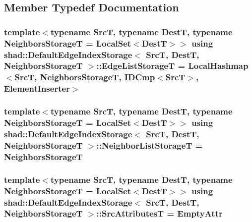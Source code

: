 \subsection{Member Typedef Documentation}
\hypertarget{classshad_1_1DefaultEdgeIndexStorage_af083de6d56b46413f55dc5fea0384afa}{
\subsubsection[{Edge\-List\-Storage\-T}]{\setlength{\rightskip}{0pt plus 5cm}template$<$typename Src\-T, typename Dest\-T, typename Neighbors\-Storage\-T = Local\-Set$<$\-Dest\-T$>$$>$ using {\bf shad\-::\-Default\-Edge\-Index\-Storage}$<$ Src\-T, Dest\-T, Neighbors\-Storage\-T $>$\-::{\bf Edge\-List\-Storage\-T} =  {\bf Local\-Hashmap}$<$Src\-T, Neighbors\-Storage\-T, {\bf I\-D\-Cmp}$<$Src\-T$>$, {\bf Element\-Inserter}$>$}}\label{classshad_1_1DefaultEdgeIndexStorage_af083de6d56b46413f55dc5fea0384afa}
\hypertarget{classshad_1_1DefaultEdgeIndexStorage_aae1425fda169243d97fa1e39e4417fa5}{
\subsubsection[{Neighbor\-List\-Storage\-T}]{\setlength{\rightskip}{0pt plus 5cm}template$<$typename Src\-T, typename Dest\-T, typename Neighbors\-Storage\-T = Local\-Set$<$\-Dest\-T$>$$>$ using {\bf shad\-::\-Default\-Edge\-Index\-Storage}$<$ Src\-T, Dest\-T, Neighbors\-Storage\-T $>$\-::{\bf Neighbor\-List\-Storage\-T} =  Neighbors\-Storage\-T}}\label{classshad_1_1DefaultEdgeIndexStorage_aae1425fda169243d97fa1e39e4417fa5}
\hypertarget{classshad_1_1DefaultEdgeIndexStorage_a70d9110c20e453941e2bfa372463bd92}{
\subsubsection[{Src\-Attributes\-T}]{\setlength{\rightskip}{0pt plus 5cm}template$<$typename Src\-T, typename Dest\-T, typename Neighbors\-Storage\-T = Local\-Set$<$\-Dest\-T$>$$>$ using {\bf shad\-::\-Default\-Edge\-Index\-Storage}$<$ Src\-T, Dest\-T, Neighbors\-Storage\-T $>$\-::{\bf Src\-Attributes\-T} =  {\bf Empty\-Attr}}}\label{classshad_1_1DefaultEdgeIndexStorage_a70d9110c20e453941e2bfa372463bd92}


